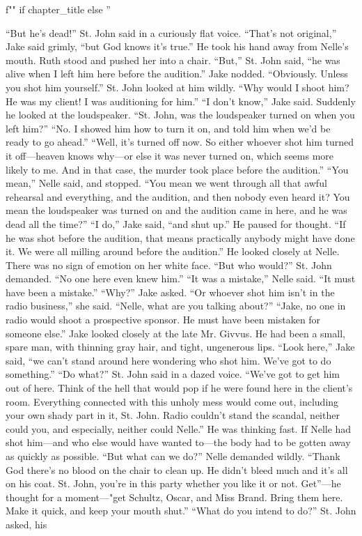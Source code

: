 \documentclass{novel}
\begin{document}
\begin{ChapterStart}
\vspace{3\nbs}
f"" if chapter_title else ''
\end{ChapterStart}

“But he’s dead!” St. John said in a curiously flat voice. “That’s not original,” Jake said grimly, “but God knows it’s true.” He took his hand away from Nelle’s mouth. Ruth stood and pushed her into a chair. “But,” St. John said, “he was alive when I left him here before the audition.” Jake nodded. “Obviously. Unless you shot him yourself.” St. John looked at him wildly. “Why would I shoot him? He was my client! I was auditioning for him.” “I don’t know,” Jake said. Suddenly he looked at the loudspeaker. “St. John, was the loudspeaker turned on when you left him?” “No. I showed him how to turn it on, and told him when we’d be ready to go ahead.” “Well, it’s turned off now. So either whoever shot him turned it off—heaven knows why—or else it was never turned on, which seems more likely to me. And in that case, the murder took place before the audition.” “You mean,” Nelle said, and stopped. “You mean we went through all that awful rehearsal and everything, and the audition, and then nobody even heard it? You mean the loudspeaker was turned on and the audition came in here, and he was dead all the time?” “I do,” Jake said, “and shut up.” He paused for thought. “If he was shot before the audition, that means practically anybody might have done it. We were all milling around before the audition.” He looked closely at Nelle. There was no sign of emotion on her white face. “But who would?” St. John demanded. “No one here even knew him.” “It was a mistake,” Nelle said. “It must have been a mistake.” “Why?” Jake asked. “Or whoever shot him isn’t in the radio business,” she said. “Nelle, what are you talking about?” “Jake, no one in radio would shoot a prospective sponsor. He must have been mistaken for someone else.” Jake looked closely at the late Mr. Givvus. He had been a small, spare man, with thinning gray hair, and tight, ungenerous lips. “Look here,” Jake said, “we can’t stand around here wondering who shot him. We’ve got to do something.” “Do what?” St. John said in a dazed voice. “We’ve got to get him out of here. Think of the hell that would pop if he were found here in the client’s room. Everything connected with this unholy mess would come out, including your own shady part in it, St. John. Radio couldn’t stand the scandal, neither could you, and especially, neither could Nelle.” He was thinking fast. If Nelle had shot him—and who else would have wanted to—the body had to be gotten away as quickly as possible. “But what can we do?” Nelle demanded wildly. “Thank God there’s no blood on the chair to clean up. He didn’t bleed much and it’s all on his coat. St. John, you’re in this party whether you like it or not. Get”—he thought for a moment—"get Schultz, Oscar, and Miss Brand. Bring them here. Make it quick, and keep your mouth shut.” “What do you intend to do?” St. John asked, his 
\end{document}
